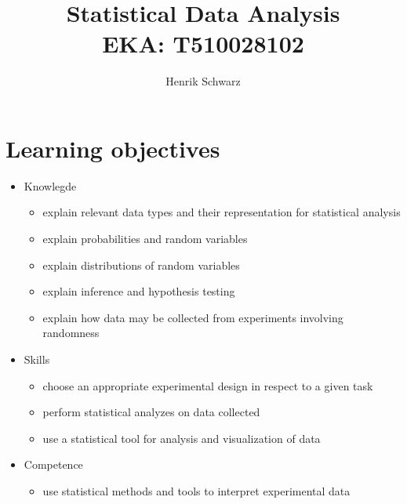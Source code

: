 \documentclass{article}
\author{Henrik Schwarz}
\title{Statistical Data Analysis \\ \small{EKA: T510028102}}
\date{}
\begin{document}
	\maketitle
	\section*{Learning objectives}
	\begin{itemize}
		\item Knowlegde
		\begin{itemize}
			\item explain relevant data types and their representation for statistical analysis
			\item explain probabilities and random variables
			\item explain distributions of random variables
			\item explain inference and hypothesis testing
			\item explain how data may be collected from experiments involving randomness 
		\end{itemize}
		\item Skills
		\begin{itemize}
			\item choose an appropriate experimental design in respect to a given task
			\item perform statistical analyzes on data collected
			\item use a statistical tool for analysis and visualization of data 
		\end{itemize}
		\item Competence
		\begin{itemize}
			\item use statistical methods and tools to interpret experimental data 
		\end{itemize}
	\end{itemize}
	\newpage
\end{document}
